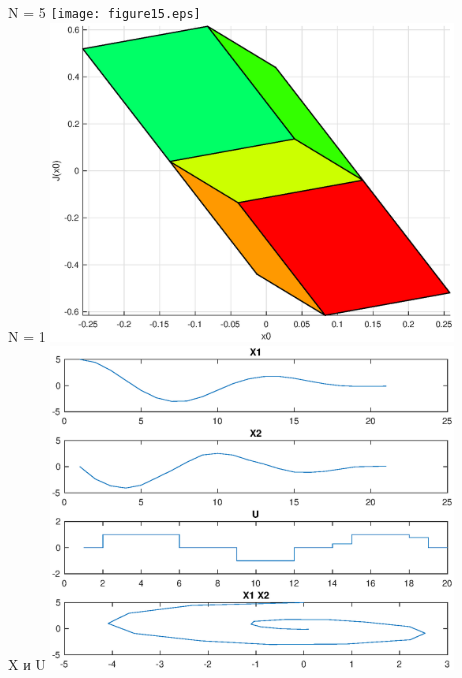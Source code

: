 N = 5
\texttt{[image: figure15.eps]}\\
N = 1
\includegraphics[width=0.8\textwidth]{figure20.eps}\\
X и U
\includegraphics[width=0.8\textwidth]{graphics.eps}